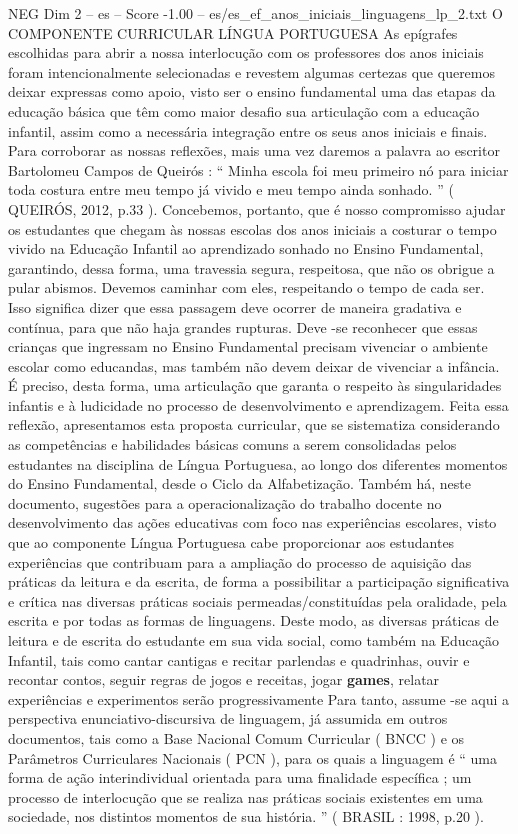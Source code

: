 \begin{textsample}{NEG Dim 2 – es – Score -1.00 – es/es\_ef\_anos\_iniciais\_linguagens\_lp\_2.txt}  \label{ex:f2_neg_076}
O COMPONENTE CURRICULAR LÍNGUA PORTUGUESA As epígrafes escolhidas para abrir a nossa interlocução com os professores dos anos iniciais foram intencionalmente selecionadas e revestem algumas certezas que queremos deixar expressas como apoio, visto ser o ensino fundamental uma das etapas da educação básica que têm como maior desafio sua articulação com a educação infantil, assim como a necessária integração entre os seus anos iniciais e finais.
Para corroborar as nossas reflexões, mais uma vez daremos a palavra ao escritor Bartolomeu Campos de Queirós : “ Minha escola foi meu primeiro nó para iniciar toda costura entre meu tempo já vivido e meu tempo ainda sonhado. ” ( QUEIRÓS, 2012, p.33 ).
Concebemos, portanto, que é nosso compromisso ajudar os estudantes que chegam às nossas escolas dos anos iniciais a costurar o tempo vivido na Educação Infantil ao aprendizado sonhado no Ensino Fundamental, garantindo, dessa forma, uma travessia segura, respeitosa, que não os obrigue a pular abismos.
Devemos caminhar com eles, respeitando o tempo de cada ser.
Isso significa dizer que essa passagem deve ocorrer de maneira gradativa e contínua, para que não haja grandes rupturas.
Deve -se reconhecer que essas crianças que ingressam no Ensino Fundamental precisam vivenciar o ambiente escolar como educandas, mas também não devem deixar de vivenciar a infância.
É preciso, desta forma, uma articulação que garanta o respeito às singularidades infantis e à ludicidade no processo de desenvolvimento e aprendizagem.
Feita essa reflexão, apresentamos esta proposta curricular, que se sistematiza considerando as competências e habilidades básicas comuns a serem consolidadas pelos estudantes na disciplina de Língua Portuguesa, ao longo dos diferentes momentos do Ensino Fundamental, desde o Ciclo da Alfabetização.
Também há, neste documento, sugestões para a operacionalização do trabalho docente no desenvolvimento das ações educativas com foco nas experiências escolares, visto que ao componente Língua Portuguesa cabe proporcionar aos estudantes experiências que contribuam para a ampliação do processo de aquisição das práticas da leitura e da escrita, de forma a possibilitar a participação significativa e crítica nas diversas práticas sociais permeadas/constituídas pela oralidade, pela escrita e por todas as formas de linguagens.
Deste modo, as diversas práticas de leitura e de escrita do estudante em sua vida social, como também na Educação Infantil, tais como cantar cantigas e recitar parlendas e quadrinhas, ouvir e recontar contos, seguir regras de jogos e receitas, jogar \textbf{games}, relatar experiências e experimentos serão progressivamente Para tanto, assume -se aqui a perspectiva enunciativo-discursiva de linguagem, já assumida em outros documentos, tais como a Base Nacional Comum Curricular ( BNCC ) e os Parâmetros Curriculares Nacionais ( PCN ), para os quais a linguagem é “ uma forma de ação interindividual orientada para uma finalidade específica ; um processo de interlocução que se realiza nas práticas sociais existentes em uma sociedade, nos distintos momentos de sua história. ” ( BRASIL : 1998, p.20 ).

\end{textsample}
